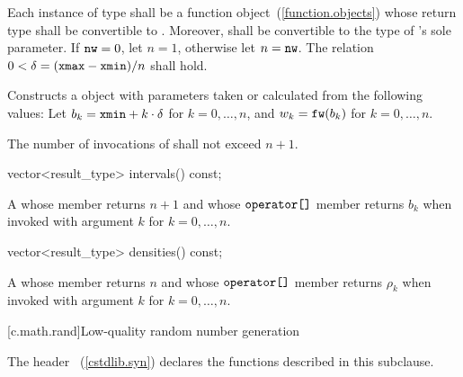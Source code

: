 \begin{itemdescr}
\pnum\requires
 Each instance of type 
 shall be a function object~(\ref{function.objects})
 whose return type shall be convertible to .
 Moreover,
  shall be convertible
 to the type of 's sole parameter.
 If $ \texttt{\protect nw} = 0 $, let $ n = 1 $, otherwise let $n = \texttt{\protect nw}$.
 The relation $ 0 < \delta = (\texttt{\protect xmax} - \texttt{\protect xmin}) / n $
 shall hold.

\pnum\effects Constructs a  object
 with parameters taken or calculated
 from the following values:
 Let $ b_k = \texttt{\protect xmin} + k \cdot \delta $ for $ k = 0, \ldots, n $,
 and $ w_k = \texttt{\protect fw}(b_k) $ for $ k = 0, \ldots, n $.

\pnum\complexity
 The number of invocations of  shall not exceed $n+1$.
\end{itemdescr}

%
\begin{itemdecl}
vector<result_type> intervals() const;
\end{itemdecl}

\begin{itemdescr}
\pnum\returns A 
 whose  member returns $n + 1$
 and whose $ \texttt{\protect operator[]} $ member returns $b_k$
 when invoked with argument $k$ for $k = 0, \ldots, n $.
\end{itemdescr}

%
\begin{itemdecl}
vector<result_type> densities() const;
\end{itemdecl}

\begin{itemdescr}
\pnum\returns A 
 whose  member returns $n$
 and whose $ \texttt{\protect operator[]} $ member returns $\rho_k$
 when invoked with argument $k$ for $ k = 0, \ldots, n $.
\end{itemdescr}%
%
%
%
%

[c.math.rand]{Low-quality random number generation}

\pnum
{}%
%
\begin{note}
The header ~(\ref{cstdlib.syn})
declares the functions described in this subclause.
\end{note}


